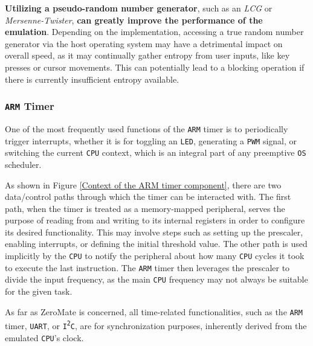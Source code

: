 \documentclass[english, ing, kiv, he, iso690numb, pdf]{fasthesis}
\begin{document}
	\textbf{Utilizing a pseudo-random number generator}, such as an \textit{LCG} \cite{lcs} or \textit{Mersenne-Twister}, \textbf{can greatly improve the performance of the emulation}. Depending on the implementation, accessing a true random number generator via the host operating system may have a detrimental impact on overall speed, as it may continually gather entropy from user inputs, like key presses or cursor movements. This can potentially lead to a blocking operation if there is currently insufficient entropy available.
	
	\subsubsection{\texttt{ARM} Timer} \label{ARM Timer}
	
	One of the most frequently used functions of the \texttt{ARM} timer is to periodically trigger interrupts, whether it is for toggling an \texttt{LED}, generating a \texttt{PWM} signal, or switching the current \texttt{CPU} context, which is an integral part of any preemptive \texttt{OS} scheduler.
	
	As shown in Figure \ref{Context of the ARM timer component}, there are two data/control paths through which the timer can be interacted with. The first path, when the timer is treated as a memory-mapped peripheral, serves the purpose of reading from and writing to its internal registers in order to configure its desired functionality. This may involve steps such as setting up the prescaler, enabling interrupts, or defining the initial threshold value. The other path is used implicitly by the \texttt{CPU} to notify the peripheral about how many \texttt{CPU} cycles it took to execute the last instruction. The \texttt{ARM} timer then leverages the prescaler to divide the input frequency, as the main \texttt{CPU} frequency may not always be suitable for the given task.
	
	\newpage
	
	\begin{important}
		As far as ZeroMate is concerned, all time-related functionalities, such as the \texttt{ARM} timer, \texttt{UART}, or \texttt{I\textsuperscript{2}C}, are for synchronization purposes, inherently derived from the emulated \texttt{CPU}'s clock.
	\end{important}
	
\end{document}
